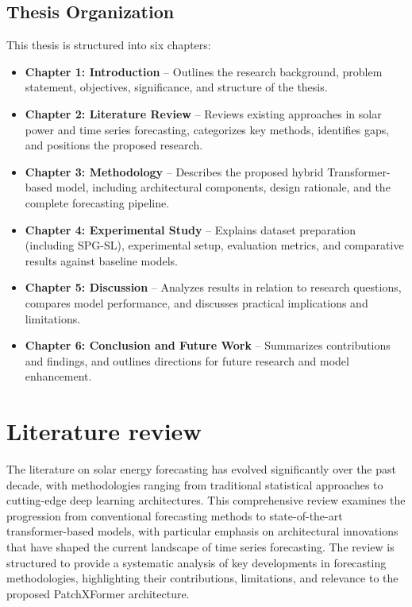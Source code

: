 \documentclass[12pt]{uomthesis}
\begin{document}
\section{Thesis Organization}
\label{sec:thesis-organization}

This thesis is structured into six chapters:

\begin{itemize}
\item \textbf{Chapter 1: Introduction} – Outlines the research background, problem statement, objectives, significance, and structure of the thesis.

\item \textbf{Chapter 2: Literature Review} – Reviews existing approaches in solar power and time series forecasting, categorizes key methods, identifies gaps, and positions the proposed research.

\item \textbf{Chapter 3: Methodology} – Describes the proposed hybrid Transformer-based model, including architectural components, design rationale, and the complete forecasting pipeline.

\item \textbf{Chapter 4: Experimental Study} – Explains dataset preparation (including SPG-SL), experimental setup, evaluation metrics, and comparative results against baseline models.

\item \textbf{Chapter 5: Discussion} – Analyzes results in relation to research questions, compares model performance, and discusses practical implications and limitations.

\item \textbf{Chapter 6: Conclusion and Future Work} – Summarizes contributions and findings, and outlines directions for future research and model enhancement.

\end{itemize}

\chapter{Literature review}
\label{ch:literature:review}

The literature on solar energy forecasting has evolved significantly over the past decade, with methodologies ranging from traditional statistical approaches to cutting-edge deep learning architectures. This comprehensive review examines the progression from conventional forecasting methods to state-of-the-art transformer-based models, with particular emphasis on architectural innovations that have shaped the current landscape of time series forecasting. The review is structured to provide a systematic analysis of key developments in forecasting methodologies, highlighting their contributions, limitations, and relevance to the proposed PatchXFormer architecture.
\end{document}
